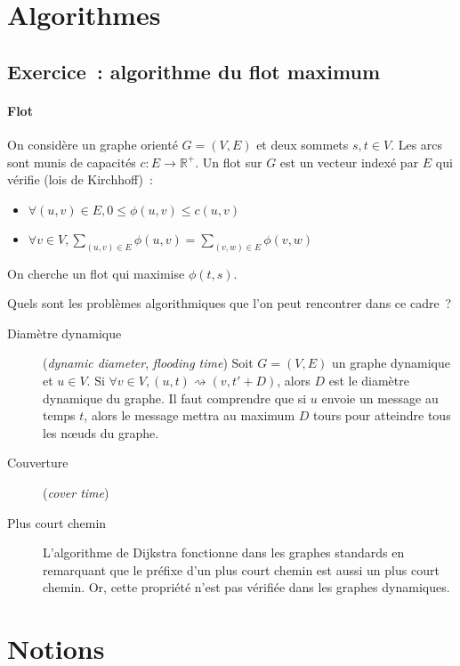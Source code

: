 \documentclass[12pt,a4paper]{article}
\begin{document}
\section{Algorithmes}

\subsection{Exercice~: algorithme du flot maximum}
\paragraph{Flot} On considère un graphe orienté \(G = (V, E)\) et deux
sommets \(s, t \in V\). Les arcs sont munis de capacités \(c : E \to
\mathbb{R}^{+}\).
Un flot sur \(G\) est un vecteur indexé par \(E\) qui vérifie (lois de
Kirchhoff)~:
\begin{itemize}
\item \(\forall (u, v) \in E, 0 \leq \phi(u, v) \leq c(u, v)\)
\item \(\forall v \in V, \sum_{(u, v) \in E} \phi(u, v) = \sum_{(v, w)
    \in E} \phi(v, w)\)
\end{itemize}
On cherche un flot qui maximise \(\phi(t, s)\).


Quels sont les problèmes algorithmiques que l'on peut rencontrer dans
ce cadre~?

\begin{description}
  \item[Diamètre dynamique] (\textit{dynamic diameter},
    \textit{flooding time}) Soit \(G = (V, E)\) un graphe dynamique et
    \(u \in V\). Si \(\forall v \in V, (u, t) \rightsquigarrow (v, t' + D)\),
    alors \(D\) est le diamètre dynamique du graphe. Il faut
    comprendre que si \(u\) envoie un message au temps \(t\), alors le
    message mettra au maximum \(D\) tours pour atteindre tous les
    nœuds du graphe.
  \item[Couverture] (\textit{cover time})
  \item[Plus court chemin] L'algorithme de Dijkstra fonctionne dans
    les graphes standards en remarquant que le préfixe d'un plus court
    chemin est aussi un plus court chemin. Or, cette propriété n'est
    pas vérifiée dans les graphes dynamiques.
\end{description}


\pagebreak

\section{Notions}
\end{document}
